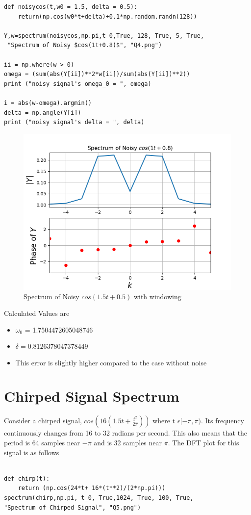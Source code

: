 \documentclass[12pt, a4paper]{report}
\begin{document}
    
    \begin{Verbatim}
def noisycos(t,w0 = 1.5, delta = 0.5):
    return(np.cos(w0*t+delta)+0.1*np.random.randn(128))

Y,w=spectrum(noisycos,np.pi,t_0,True, 128, True, 5, True,
 "Spectrum of Noisy $cos(1t+0.8)$", "Q4.png")

ii = np.where(w > 0)
omega = (sum(abs(Y[ii])**2*w[ii])/sum(abs(Y[ii])**2))
print ("noisy signal's omega_0 = ", omega)

i = abs(w-omega).argmin()
delta = np.angle(Y[i])
print ("noisy signal's delta = ", delta)
\end{Verbatim}
 
   \begin{figure}[!tbh]
   	\centering
   	\includegraphics[scale=0.7]{Q4.png}
	\caption{Spectrum of Noisy $cos(1.5t+0.5)$ with windowing}
 \end{figure} 

Calculated Values are
\begin{itemize}

      \item $\omega_0$ =  1.7504472605048746
      \item $\delta =  0.8126378047378449$ 
      \item This error is slightly higher compared to the case without noise

\end{itemize}
   
  \section*{Chirped Signal Spectrum} 
  Consider a chirped signal, $cos(16(1.5t+ \frac{t^2}{2\pi}))$ where t $\epsilon   [-\pi,\pi)$. Its frequency continuously changes from 16 to 32 radians per second. This also means that the period is 64 samples near $-\pi$ and is 32 samples near $\pi$. The DFT plot for this signal is as follows
  \begin{Verbatim}
  
def chirp(t):
    return (np.cos(24*t+ 16*(t**2)/(2*np.pi)))
spectrum(chirp,np.pi, t_0, True,1024, True, 100, True,
"Spectrum of Chirped Signal", "Q5.png")
\end{Verbatim}
\end{document}
